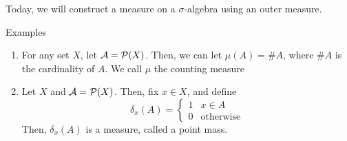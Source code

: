
Today, we will construct a measure on a $\sigma$-algebra using an outer measure.

\begin{example}{Examples}
    \begin{enumerate}
        \item For any set $X$, let $\mathcal{A} = \P(X)$. Then, we can let $\mu(A) = \#A$, where $\#A$ is the cardinality of $A$. We call $\mu$ the counting measure
        \item Let $X$ and $\mathcal{A} = \P(X)$. Then, fix $x \in X$, and define
        \[ \delta_{x}(A) = \left\{\begin{matrix} 1 & x \in A \\ 0 & \text{otherwise}\end{matrix}\right. \]
        Then, $\delta_{x}(A)$ is a measure, called a point mass.
    \end{enumerate}
\end{example}

